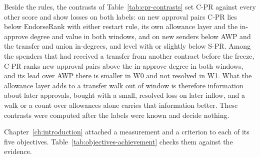 Beside the rules, the contrasts of Table~\ref{tab:cpr-contrasts} set \mbox{C-PR} against every other score and show losses on both labels: on new approval pairs \mbox{C-PR} lies below EndorseRank with either restart rule, its own allowance layer and the in-approve degree and value in both windows, and on new senders below AWP and the transfer and union in-degrees, and level with or slightly below \mbox{S-PR}. Among the spenders that had received a transfer from another contract before the freeze, \mbox{C-PR} ranks new approval pairs above the in-approve degree in both windows, and its lead over AWP there is smaller in W0 and not resolved in W1. What the allowance layer adds to a transfer walk out of window is therefore information about later approvals, bought with a small, resolved loss on later inflow, and a walk or a count over allowances alone carries that information better. These contrasts were computed after the labels were known and decide nothing.


Chapter~\ref{ch:introduction} attached a measurement and a criterion to each of its five objectives. Table~\ref{tab:objectives-achievement} checks them against the evidence.


